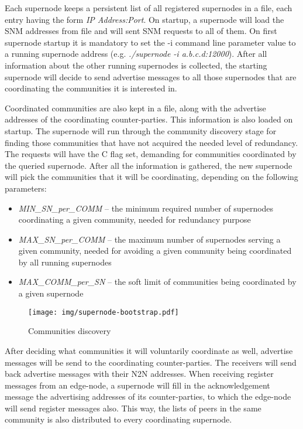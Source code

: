 Each supernode keeps a persistent list of all registered supernodes in a file, each entry having the form \emph{IP Address:Port}. On startup, a supernode will load the SNM addresses from file and will sent SNM requests to all of them. On first supernode startup it is mandatory to set the -i command line parameter value to a running supernode address (e.g. \emph{./supernode -i a.b.c.d:12000}). After all information about the other running supernodes is collected, the starting supernode will decide to send advertise messages to all those supernodes that are coordinating the communities it is interested in.

Coordinated communities are also kept in a file, along with the advertise addresses of the coordinating counter-parties. This information is also loaded on startup. The supernode will  run through the community discovery stage for finding those communities that have not acquired the needed level of redundancy. The requests will have the C flag set, demanding for communities coordinated by the queried supernode. After all the information is gathered, the new supernode will pick the communities that it will be coordinating, depending on the following parameters: 
\begin{itemize}
\item \emph{MIN_SN_per_COMM} – the minimum required number of supernodes coordinating a given community, needed for redundancy purpose 
\item \emph{MAX_SN_per_COMM} – the maximum number of supernodes serving a given community, needed for avoiding a given community being coordinated by all running supernodes 
\item \emph{MAX_COMM_per_SN} – the soft limit of communities being coordinated by a given supernode
\end{itemize}

\begin{figure}[hbtp]
\begin{center}
\texttt{[image: img/supernode-bootstrap.pdf]}
\caption{Communities discovery \label{img:supernode-bootstrap}}
\end{center}
\end{figure}

After deciding what communities it will voluntarily coordinate as well, advertise messages will be send to the coordinating counter-parties. The receivers will send back advertise messages with their N2N addresses. When receiving register messages from an edge-node, a supernode will fill in the acknowledgement message the advertising addresses of its counter-parties, to which the edge-node will send register messages also. This way, the lists of peers in the same community is also distributed to every coordinating supernode. 


